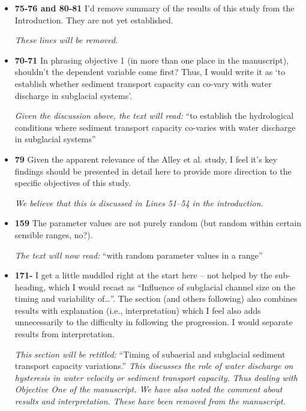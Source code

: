 \documentclass[11pt]{article}
\begin{document}
\begin{itemize}
\item \textbf{75-76 and 80-81} I’d remove summary of the results of this study from the Introduction. They
  are not yet established.

  \textit{These lines will be removed.}

\item \textbf{70-71} In phrasing objective 1 (in more than one place in the manuscript),
  shouldn’t the dependent variable come first? Thus, I would write it as ‘to
  establish whether sediment transport capacity can co-vary with water
  discharge in subglacial systems’.

  \textit{Given the discussion above, the text will read:} ``to establish the hydrological conditions where  sediment transport capacity co-varies with water discharge in subglacial systems''
  
\item \textbf{79} Given the apparent relevance of the Alley et al. study, I feel it’s key findings
  should be presented in detail here to provide more direction to the specific
  objectives of this study.

  \textit{We believe that this is discussed in Lines 51--54 in the introduction.}


  
\item \textbf{159} The parameter values are not purely random (but random within certain
  sensible ranges, no?).

  \textit{The text will now  read:} ``with random parameter values in a range''

\item \textbf{171-} I get a little muddled right at the start here – not helped by the sub-heading,
  which I would recast as “Influence of subglacial channel size on the timing
  and variability of…”. The section (and others following) also combines
  results with explanation (i.e., interpretation) which I feel also adds
  unnecessarily to the difficulty in following the progression. I would separate
  results from interpretation.

  \textit{This section will be retitled:} ``Timing of subaerial and subglacial sediment transport capacity variations.''
  \textit{This discusses the role of water discharge on hysteresis in water velocity or sediment transport capacity. Thus dealing with Objective One of the manuscript. We have also noted the comment about results and interpretation. These have been removed from the manuscript.}
  


\end{itemize}
\end{document}

